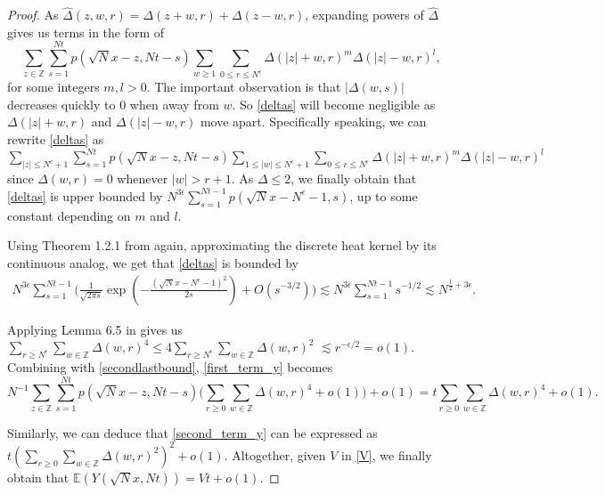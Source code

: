 \documentclass[10pt]{article}
\begin{document}
\begin{proof}
As $\hat{\Delta}(z,w,r)=\Delta(z+w,r)+\Delta(z-w,r)$, expanding powers of $\hat{\Delta}$ gives us terms in the form of 
\begin{equation} \label{deltas}
    \sum_{z \in \mathbb{Z}} \sum_{s=1}^{Nt} p(\sqrt{N}x-z, Nt-s) \sum_{w \geq 1} \sum_{0 \leq r \leq N^{\epsilon}} \Delta(|z|+ w, r)^m \Delta(|z|- w, r)^l,
\end{equation} 
for some integers $m,l>0$. The important observation is that $|\Delta(w,s)|$ decreases quickly to 0 when away from $w$. So \eqref{deltas} will become negligible as $\Delta(|z|+ w, r)$ and $\Delta(|z|- w, r)$ move apart. Specifically speaking, we can rewrite \eqref{deltas} as $\sum_{|z|\leq N^{\epsilon}+1} \sum_{s=1}^{Nt} p(\sqrt{N}x-z, Nt-s) \sum_{1\leq |w|\leq N^{\epsilon}+1} \sum_{0 \leq r \leq N^{\epsilon}} \Delta(|z|+ w, r)^m \Delta(|z|- w, r)^l$ since $\Delta(w,r)=0$ whenever $|w|>r+1$. As $\Delta \leq 2$, we finally obtain that \eqref{deltas} is upper bounded by $N^{3\epsilon} \sum_{s=1}^{Nt-1} p(\sqrt{N}x-N^{\epsilon}-1, s)$, up to some constant depending on $m$ and $l$.

Using Theorem 1.2.1 from \cite{intersections} again, approximating the discrete heat kernel by its continuous analog, we get that \eqref{deltas} is bounded by
\begin{align} \label{secondlastbound}
    N^{3\epsilon} \sum_{s=1}^{Nt-1} \Big(\frac{1}{\sqrt{2\pi s}}\exp(-\frac{(\sqrt{N}x-N^{\epsilon}-1)^2}{2s}) + O(s^{-3/2})\Big)  \lesssim  N^{3\epsilon} \sum_{s=1}^{Nt-1} s^{-1/2}
        \lesssim N^{\frac{1}{2}+3\epsilon}.
\end{align}

Applying Lemma 6.5 in \cite{adhikari2022invariance} gives us
$\sum_{r \geq N^{\epsilon}}\sum_{w \in \mathbb{Z}} \Delta( w, r)^4 \leq 4\sum_{r \geq N^{\epsilon}}\sum_{w \in \mathbb{Z}} \Delta( w, r)^2$ $\lesssim  r^{-\epsilon/2} = o(1).$ Combining with \eqref{secondlastbound}, \eqref{first_term_y} becomes
\begin{equation}
N^{-1} \sum_{z \in \mathbb{Z}}\sum_{s=1}^{Nt} p(\sqrt{N}x-z, Nt-s) \Big(\sum_{r \geq 0}\sum_{w \in \mathbb{Z}} \Delta( w, r)^4+o(1)\Big)+o(1)= t \sum_{r \geq 0}\sum_{w \in \mathbb{Z}} \Delta( w, r)^4+o(1).
\end{equation}

Similarly, we can deduce that \eqref{second_term_y} can be expressed as $t (\sum_{r \geq 0}\sum_{w \in \mathbb{Z}} \Delta(w, r)^2)^2 +o(1)$. Altogether, given $V$ in \eqref{V}, we finally obtain that $\mathbb{E}(Y(\sqrt{N}x, Nt))=Vt+o(1).$
\end{proof}
\end{document}
